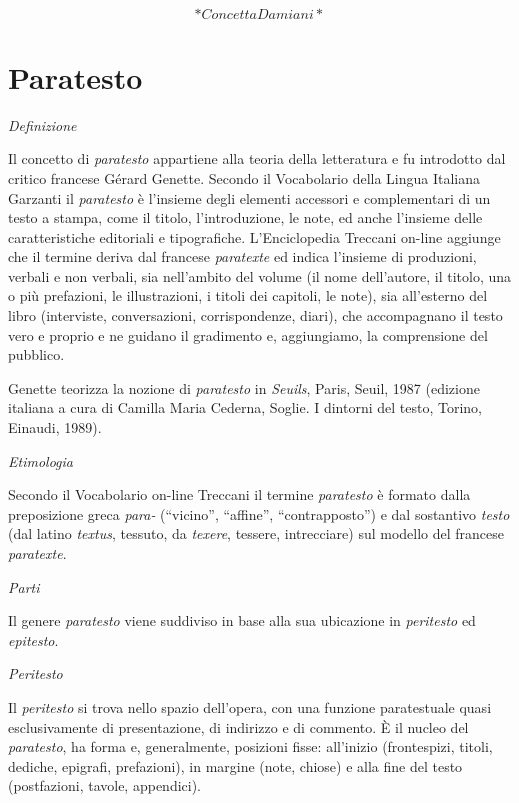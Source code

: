 \documentclass[
  b5paper,
  twoside,
  11pt,
  chapterprefix=false,
  bibliography=totocnumbered,
  parskip=0]{scrbook}
\begin{document}
~

\[*Concetta Damiani*\]

\hypertarget{paratesto}{%
\chapter{Paratesto}\label{paratesto}}

\emph{Definizione}

Il concetto di \emph{paratesto} appartiene alla teoria della letteratura e fu
introdotto dal critico francese Gérard Genette. Secondo il Vocabolario
della Lingua Italiana Garzanti il \emph{paratesto} è l'insieme degli elementi
accessori e complementari di un testo a stampa, come il titolo,
l'introduzione, le note, ed anche l'insieme delle caratteristiche
editoriali e tipografiche. L'Enciclopedia Treccani on-line aggiunge che
il termine deriva dal francese \emph{paratexte} ed indica l'insieme di
produzioni, verbali e non verbali, sia nell'ambito del volume (il nome
dell'autore, il titolo, una o più prefazioni, le illustrazioni, i titoli
dei capitoli, le note), sia all'esterno del libro (interviste,
conversazioni, corrispondenze, diari), che accompagnano il testo vero e
proprio e ne guidano il gradimento e, aggiungiamo, la comprensione del
pubblico.

Genette teorizza la nozione di \emph{paratesto} in \emph{Seuils}, Paris, Seuil,
1987 (edizione italiana a cura di Camilla Maria Cederna, Soglie. I
dintorni del testo, Torino, Einaudi, 1989).

\emph{Etimologia}

Secondo il Vocabolario on-line Treccani il termine \emph{paratesto} è formato
dalla preposizione greca \emph{para-} (\enquote{vicino}, \enquote{affine}, \enquote{contrapposto}) e
dal sostantivo \emph{testo} (dal latino \emph{textus}, tessuto, da \emph{texere},
tessere, intrecciare) sul modello del francese \emph{paratexte}.

\emph{Parti}

Il genere \emph{paratesto} viene suddiviso in base alla sua ubicazione in
\emph{peritesto} ed \emph{epitesto}.

\emph{Peritesto}

Il \emph{peritesto} si trova nello spazio dell'opera, con una funzione
paratestuale quasi esclusivamente di presentazione, di indirizzo e di
commento. È il nucleo del \emph{paratesto}, ha forma e, generalmente,
posizioni fisse: all'inizio (frontespizi, titoli, dediche, epigrafi,
prefazioni), in margine (note, chiose) e alla fine del testo
(postfazioni, tavole, appendici).
\end{document}
